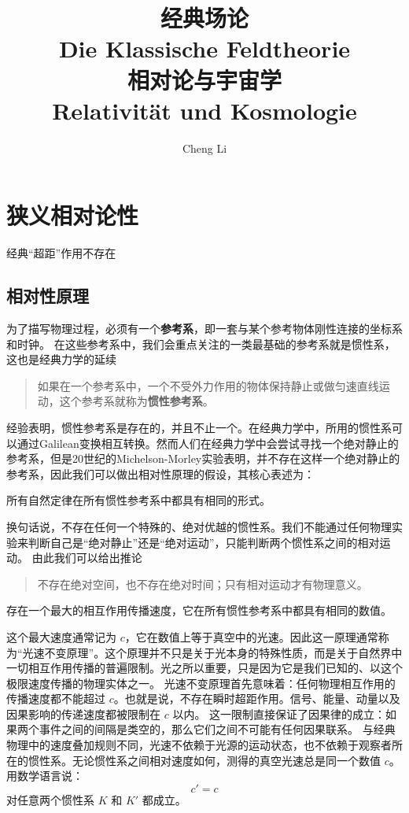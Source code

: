 \documentclass[a4paper]{report}
\author{Cheng Li}
\title{\textbf{{\Huge 经典场论\\ Die Klassische Feldtheorie}}\\\normalsize 相对论与宇宙学\\Relativit\"{a}t und Kosmologie}
\begin{document}
\maketitle
\tableofcontents


\chapter{狭义相对论性}
经典“超距”作用不存在
\section{相对性原理}


为了描写物理过程，必须有一个\textbf{参考系}，即一套与某个参考物体刚性连接的坐标系和时钟。
在这些参考系中，我们会重点关注的一类最基础的参考系就是惯性系，这也是经典力学的延续
\begin{quote}
如果在一个参考系中，一个不受外力作用的物体保持静止或做匀速直线运动，这个参考系就称为\textbf{惯性参考系}。
\end{quote}
经验表明，惯性参考系是存在的，并且不止一个。在经典力学中，所用的惯性系可以通过Galilean变换相互转换。然而人们在经典力学中会尝试寻找一个绝对静止的参考系，但是20世纪的Michelson-Morley实验表明，并不存在这样一个绝对静止的参考系，因此我们可以做出相对性原理的假设，其核心表述为：
\begin{theorem}[相对性原理]
所有自然定律在所有惯性参考系中都具有相同的形式。
\end{theorem}
换句话说，不存在任何一个特殊的、绝对优越的惯性系。我们不能通过任何物理实验来判断自己是“绝对静止”还是“绝对运动”，只能判断两个惯性系之间的相对运动。
由此我们可以给出推论
\begin{quote}
不存在绝对空间，也不存在绝对时间；只有相对运动才有物理意义。
\end{quote}

\begin{theorem}[光速不变原理]
    存在一个最大的相互作用传播速度，它在所有惯性参考系中都具有相同的数值。
\end{theorem}


这个最大速度通常记为 \(c\)，它在数值上等于真空中的光速。因此这一原理通常称为“光速不变原理”。这个原理并不只是关于光本身的特殊性质，而是关于自然界中一切相互作用传播的普遍限制。光之所以重要，只是因为它是我们已知的、以这个极限速度传播的物理实体之一。
光速不变原理首先意味着：任何物理相互作用的传播速度都不能超过 \(c\)。也就是说，不存在瞬时超距作用。信号、能量、动量以及因果影响的传递速度都被限制在 \(c\) 以内。
这一限制直接保证了因果律的成立：如果两个事件之间的间隔是类空的，那么它们之间不可能有任何因果联系。
与经典物理中的速度叠加规则不同，光速不依赖于光源的运动状态，也不依赖于观察者所在的惯性系。无论惯性系之间相对速度如何，测得的真空光速总是同一个数值 \(c\)。
用数学语言说：
\[
c' = c
\]
对任意两个惯性系 \(K\) 和 \(K'\) 都成立。
\end{document}

